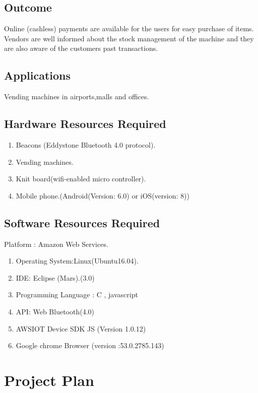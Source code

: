 \documentclass[oneside,a4paper,12pt]{report}
\begin{document}
\section{Outcome}

 Online (cashless) payments are available for the users for easy purchase of items.
Vendors are well informed about the stock management of the machine and they are also aware of the customers past transactions.

\section{Applications}

Vending machines in airports,malls and offices.

\section{Hardware Resources Required}
\begin{enumerate}
\item Beacons (Eddystone Bluetooth 4.0 protocol).
\item Vending machines.
\item Knit board(wifi-enabled micro controller).
\item Mobile phone.(Android(Version: 6.0) or iOS(version: 8))
\end{enumerate}


\section{Software Resources Required}
Platform : Amazon Web Services.
\begin{enumerate}
\item Operating System:Linux(Ubuntu16.04). 
\item IDE: Eclipse (Mars).(3.0)
\item Programming Language : C , javascript
\item API: Web Bluetooth(4.0)
\item AWSIOT Device SDK JS (Version 1.0.12)
\item Google chrome Browser (version :53.0.2785.143)
\end{enumerate}




\chapter{Project Plan}
\end{document}
